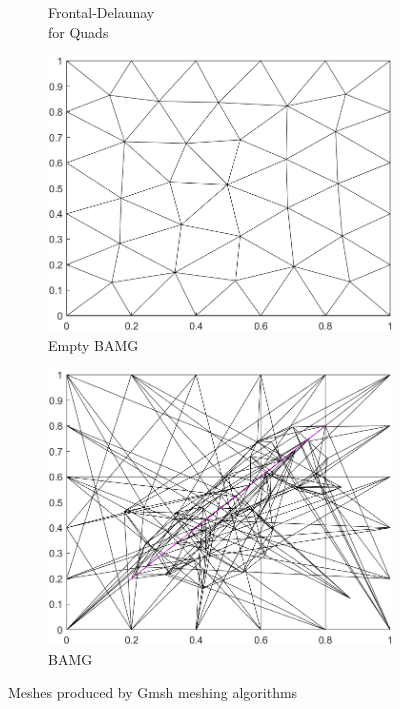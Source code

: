 \begin{figure}[ht]
\begin{subfigure}[b]{0.33\textwidth}
        \caption{Frontal-Delaunay\\ for Quads}
        \label{fig:Gmsh-Frontal-Quads}
    \end{subfigure}
    \begin{subfigure}[b]{0.33\textwidth}
        \centering
        \includegraphics[width=\textwidth]{report/Images/Software/Gmsh meshing algorithms/gmsh_meshing_algorithms_bamg.png}
        \caption{Empty BAMG}
        \label{fig:Gmsh-BAMG-empty}
    \end{subfigure}
    \begin{subfigure}[b]{0.33\textwidth}
        \centering
        \includegraphics[width=\textwidth]{report/Images/Software/Gmsh meshing algorithms/gmsh_meshing_algorithms_embedded_bamg.png}
        \caption{BAMG}
        \label{fig:Gmsh-BAMG}
    \end{subfigure}
    \caption{Meshes produced by Gmsh meshing algorithms}
    \label{fig:Gmsh-meshing-algorithms}
\end{figure}

